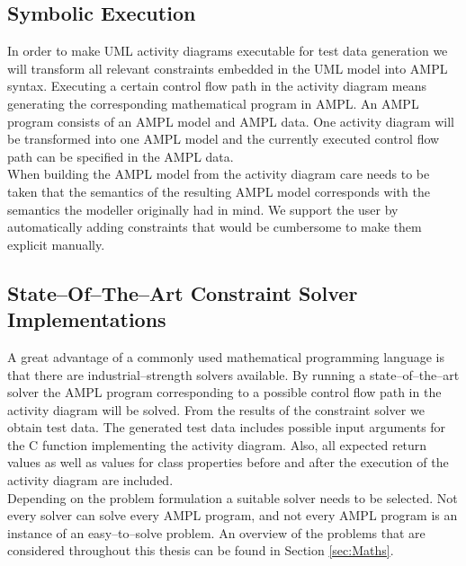 \subsection{Symbolic Execution}
In order to make UML activity diagrams executable for test data generation we will transform all relevant constraints embedded in the UML model into AMPL syntax. Executing a certain control flow path in the activity diagram means generating the corresponding mathematical program in AMPL. An AMPL program consists of an AMPL model and AMPL data. One activity diagram will be transformed into one AMPL model and the currently executed control flow path can be specified in the AMPL data.\\
When building the AMPL model from the activity diagram care needs to be taken that the semantics of the resulting AMPL model corresponds with the semantics the modeller originally had in mind. We support the user by automatically adding constraints that would be cumbersome to make them explicit manually.
\subsection{State--Of--The--Art Constraint Solver Implementations} 
A great advantage of a commonly used mathematical programming language is that there are industrial--strength solvers available. By running a state--of--the--art solver the AMPL program corresponding to a possible control flow path in the activity diagram will be solved. From the results of the constraint solver we obtain test data. The generated test data includes possible input arguments for the C function implementing the activity diagram. Also, all expected return values as well as values for class properties before and after the execution of the activity diagram are included.\\
Depending on the problem formulation a suitable solver needs to be selected. Not every solver can solve every AMPL program, and not every AMPL program is an instance of an easy--to--solve problem. An overview of the problems that are considered throughout this thesis can be found in Section \ref{sec:Maths}.
